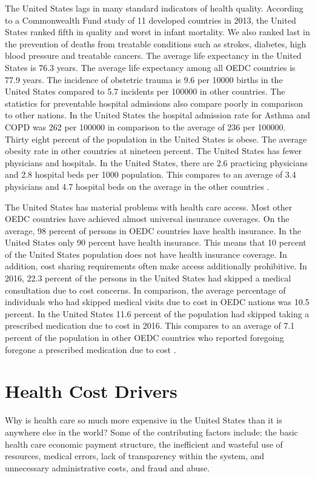 \documentclass[sigconf]{acmart}
\begin{document}
The United States lags in many standard indicators of health quality.  According to a Commonwealth Fund study of 11 developed countries in 2013, the United States ranked fifth in quality and worst in infant mortality. We also ranked last in the prevention of deaths from treatable conditions such as strokes, diabetes, high blood pressure and treatable cancers.  The average life expectancy in the United States is 76.3 years.  The average life expectancy among all OEDC countries is 77.9 years.  The incidence of obstetric trauma is 9.6 per 10000 births in the United States compared to 5.7 incidents per 100000 in other countries. The statistics for preventable hospital admissions also compare poorly in comparison to other nations. In the United States the hospital admission rate for Asthma and COPD was 262 per 100000 in comparison to the average of 236 per 100000. Thirty eight percent of the population in the United States is obese. The average obesity rate in other countries at nineteen percent.  The United States has fewer physicians and hospitals.  In the United States, there are 2.6 practicing physicians and 2.8 hospital beds per 1000 population. This compares to an average of 3.4 physicians and 4.7 hospital beds on the average in the other countries \cite{OEDC}. 

The United States has material problems with health care access.  Most other OEDC countries have achieved almost universal insurance coverages. On the average, 98 percent of persons in OEDC countries have health insurance. In the United States only 90 percent have health insurance. This means that 10 percent of the United States population does not have health insurance coverage. In addition, cost sharing requirements often make access additionally prohibitive.   In 2016, 22.3 percent of the persons in the United States had skipped a medical consultation due to cost concerns. In comparison, the average percentage of individuals who had skipped medical visits due to cost in OEDC nations was 10.5 percent.  In the United States 11.6 percent of the population had skipped taking a prescribed medication due to cost in 2016. This compares to an average of 7.1 percent of the population in other OEDC countries who reported foregoing foregone a prescribed medication due to cost \cite{OEDC}.


\section{Health Cost Drivers}
Why is health care so much more expensive in the United States than it is anywhere else in the world?  Some of the contributing factors include: the basic health care economic payment structure, the inefficient and wasteful use of resources, medical errors, lack of transparency within the system, and unnecessary administrative costs, and fraud and abuse.
\end{document}
